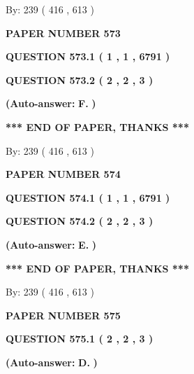 \documentclass[12pt]{article}
\begin{document}
   
\hspace{1.0in} By: 
 239 ( 416 ,  613 )
   
   
   
   
\newpage 
\setcounter{page}{ 
   573001 } 
   
   
 {\textbf{ \Large{ PAPER NUMBER  573  }}}
   
   
   
   
  
  
{\textbf{\large{QUESTION
573.1 
 ( 1 , 1 , 6791 )
}}}
  
  
{\textbf{\large{QUESTION
573.2 
 ( 2 , 2 , 3 )
}}}
 
 
{\textbf{(Auto-answer:}}
{\textbf{\large{
F.}}}
{\textbf{)}}
 
 
   
   
   
   
\vspace{1.0in} 
{\textbf{\large{ *** END OF PAPER, THANKS *** }}} 
   
   
\hspace{1.0in} By: 
 239 ( 416 ,  613 )
   
   
   
   
\newpage 
\setcounter{page}{ 
   574001 } 
   
   
 {\textbf{ \Large{ PAPER NUMBER  574  }}}
   
   
   
   
  
  
{\textbf{\large{QUESTION
574.1 
 ( 1 , 1 , 6791 )
}}}
  
  
{\textbf{\large{QUESTION
574.2 
 ( 2 , 2 , 3 )
}}}
 
 
{\textbf{(Auto-answer:}}
{\textbf{\large{
E.}}}
{\textbf{)}}
 
 
   
   
   
   
\vspace{1.0in} 
{\textbf{\large{ *** END OF PAPER, THANKS *** }}} 
   
   
\hspace{1.0in} By: 
 239 ( 416 ,  613 )
   
   
   
   
\newpage 
\setcounter{page}{ 
   575001 } 
   
   
 {\textbf{ \Large{ PAPER NUMBER  575  }}}
   
   
   
   
  
  
{\textbf{\large{QUESTION
575.1 
 ( 2 , 2 , 3 )
}}}
 
 
{\textbf{(Auto-answer:}}
{\textbf{\large{
D.}}}
{\textbf{)}}
 
\end{document}
